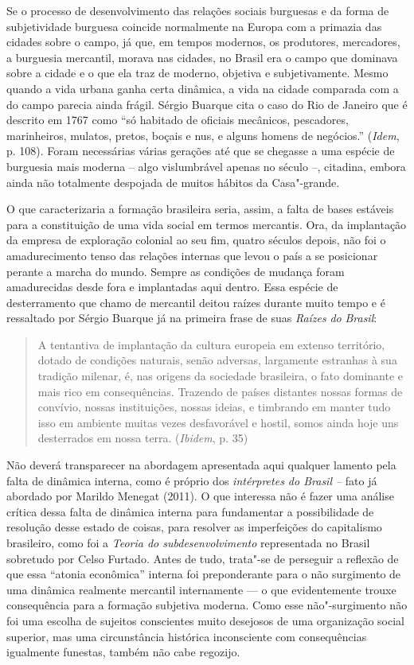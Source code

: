 Se o processo de desenvolvimento das relações sociais burguesas e da
forma de subjetividade burguesa coincide normalmente na Europa com a
primazia das cidades sobre o campo, já que, em tempos modernos, os
produtores, mercadores, a burguesia mercantil, morava nas cidades, no
Brasil era o campo que dominava sobre a cidade e o que ela traz de
moderno, objetiva e subjetivamente. Mesmo quando a vida urbana ganha
certa dinâmica, a vida na cidade comparada com a do campo parecia ainda
frágil. Sérgio Buarque cita o caso do Rio de Janeiro que é descrito em
1767 como ``só habitado de oficiais mecânicos, pescadores, marinheiros,
mulatos, pretos, boçais e nus, e alguns homens de negócios.'' (\emph{Idem}, p. 108). Foram
necessárias várias gerações até que se chegasse a uma espécie de
burguesia mais moderna -- algo vislumbrável apenas no século  --,
citadina, embora ainda não totalmente despojada de muitos hábitos da
Casa"-grande.

O que caracterizaria a formação brasileira seria, assim, a falta de
bases estáveis para a constituição de uma vida social em termos
mercantis. Ora, da implantação da empresa de exploração colonial ao seu
fim, quatro séculos depois, não foi o amadurecimento tenso das relações
internas que levou o país a se posicionar perante a marcha do mundo.
Sempre as condições de mudança foram amadurecidas desde fora e
implantadas aqui dentro. Essa espécie de desterramento que chamo de mercantil deitou
raízes durante muito tempo e é ressaltado por Sérgio Buarque já na
primeira frase de suas \emph{Raízes} \emph{do} \emph{Brasil}:

\begin{quote}
A tentantiva de implantação da cultura europeia em extenso território,
dotado de condições naturais, senão adversas, largamente estranhas à sua
tradição milenar, é, nas origens da sociedade brasileira, o fato
dominante e mais rico em consequências. Trazendo de países distantes
nossas formas de convívio, nossas instituições, nossas ideias, e
timbrando em manter tudo isso em ambiente muitas vezes desfavorável e
hostil, somos ainda hoje uns desterrados em nossa terra. (\emph{Ibidem},
p. 35)
\end{quote}

Não deverá
transparecer na abordagem apresentada aqui qualquer lamento pela falta de dinâmica
interna, como é próprio dos \emph{intérpretes do Brasil --} fato já
abordado por Marildo Menegat (2011). O que interessa não é fazer uma
análise crítica dessa falta de dinâmica interna para fundamentar a
possibilidade de resolução desse estado de coisas, para resolver as
imperfeições do capitalismo brasileiro, como foi a \emph{Teoria do
subdesenvolvimento} representada no Brasil sobretudo por Celso Furtado.
Antes de tudo, trata"-se de perseguir a reflexão de que essa ``atonia
econômica'' interna foi preponderante para o não surgimento de uma
dinâmica realmente mercantil internamente --- o que evidentemente trouxe
consequência para a formação subjetiva moderna. Como esse não"-surgimento não
foi uma escolha de sujeitos conscientes muito desejosos de uma
organização social superior, mas uma circunstância histórica
inconsciente com consequências igualmente funestas, também não cabe
regozijo.

